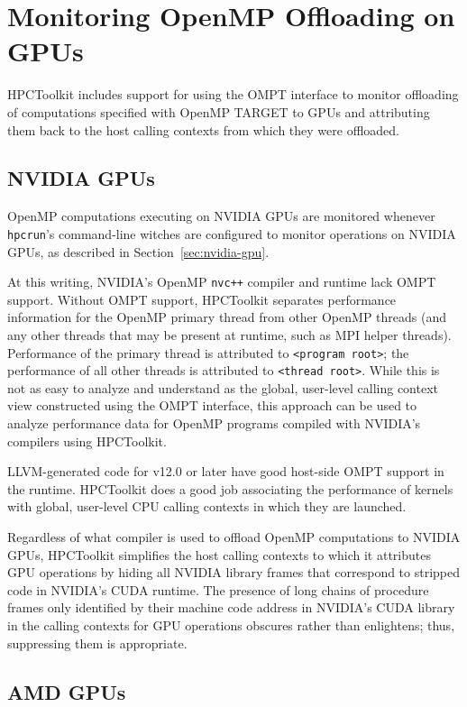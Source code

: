 \documentclass[11pt,twoside,letterpaper]{report}
\begin{document}
\section{Monitoring OpenMP Offloading on GPUs}

HPCToolkit includes support for using the OMPT interface to monitor offloading of computations specified with OpenMP TARGET to GPUs and attributing them back to the host calling contexts from which they were offloaded.

\subsection{NVIDIA GPUs}

OpenMP computations executing on NVIDIA GPUs are monitored whenever {\tt hpcrun}'s command-line witches are configured to monitor operations on NVIDIA GPUs, as described in Section~\ref{sec:nvidia-gpu}.

At this writing, NVIDIA's OpenMP {\tt nvc++} compiler and
runtime lack OMPT support. Without OMPT support, HPCToolkit
separates performance information for the OpenMP primary thread from
other OpenMP threads (and any other threads that may be present at
runtime, such as MPI helper threads). Performance of the primary thread is
attributed to \verb|<program root>|; the performance of all other threads
is attributed to \verb|<thread root>|. While this is not as easy to analyze and understand
as the global, user-level calling context view constructed using the OMPT interface,
this approach can be used to analyze performance data for OpenMP programs
compiled with NVIDIA's compilers using HPCToolkit.

LLVM-generated code for  v12.0 or later have good host-side OMPT
support in the runtime. HPCToolkit does a good job associating
the performance of kernels with global, user-level CPU calling contexts in which
they are launched.

Regardless of what compiler is used to offload OpenMP computations to NVIDIA GPUs, HPCToolkit simplifies the host calling contexts to which it attributes GPU operations by hiding all NVIDIA library frames that correspond to stripped code in NVIDIA's CUDA runtime.
The presence of long chains of procedure frames only identified by their machine code address in NVIDIA's CUDA library in the calling contexts for GPU operations obscures rather than enlightens;
thus, suppressing them is appropriate.

\subsection{AMD GPUs}
\end{document}
